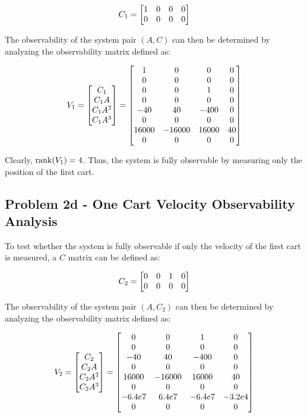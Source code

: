 \documentclass[]{article}
\begin{document}
		\begin{equation}
			C_1 = \mqty[1	&0	&0	&0\\
					  	0	&0	&0	&0]
		\end{equation}

		The observability of the system pair $(A, C)$ can then be determined by analyzing the observability matrix defined as:
		
		\begin{equation}
			V_1 = \mqty[C_1\\ C_1A\\ C_1A^2\\ C_1A^3]
				= \mqty[1		&0		&0		&0\\
						0		&0		&0		&0\\
						0		&0		&1		&0\\
						0		&0		&0		&0\\
						-40		&40		&-400	&0\\
						0		&0		&0		&0\\
						16000	&-16000	&16000	&40\\
						0		&0		&0		&0]
		\end{equation}
		
		Clearly, $\rank(V_1) = 4$. Thus, the system is fully observable by measuring only the position of the first cart.

	\subsection{Problem 2d - One Cart Velocity Observability Analysis}
		To test whether the system is fully observable if only the velocity of the first cart is measured, a $C$ matrix can be defined as:
		
		\begin{equation}
			C_2 = \mqty[0	&0	&1	&0\\
						0	&0	&0	&0]
		\end{equation}
		
		The observability of the system pair $(A, C_2)$ can then be determined by analyzing the observability matrix defined as:
		
		\begin{equation}
			V_2 = \mqty[C_2\\ C_2A\\ C_2A^2\\ C_2A^3]
				= \mqty[0		&0		&1		&0\\
						0		&0		&0		&0\\
						-40		&40		&-400	&0\\
						0		&0		&0		&0\\
						16000	&-16000	&16000	&40\\
						0		&0		&0		&0\\
						-6.4e7	&6.4e7	&-6.4e7	&-3.2e4\\
						0		&0		&0		&0]
		\end{equation}
		
\end{document}
